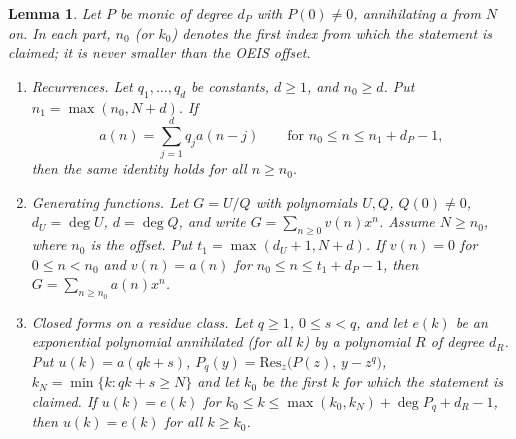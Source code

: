 \documentclass[11pt]{article}
\newtheorem{lemma}[theorem]{Lemma}
\theoremstyle{definition}
\theoremstyle{remark}
\begin{document}
\begin{lemma}\label{lem:fin}
Let $P$ be monic of degree $d_P$ with $P(0)\ne0$, annihilating $a$ from $N$ on. In each part, $n_0$ (or $k_0$) denotes the first index from which the statement is claimed; it is never smaller than the OEIS offset.
\begin{enumerate}
\item[(a)] \emph{Recurrences.} Let $q_1,\dots,q_d$ be constants, $d\ge1$, and $n_0\ge d$. Put $n_1=\max(n_0,N+d)$. If
\[ a(n)=\textstyle\sum_{j=1}^{d}q_ja(n-j)\qquad\text{for } n_0\le n\le n_1+d_P-1, \]
then the same identity holds for all $n\ge n_0$.
\item[(b)] \emph{Generating functions.} Let $G=U/Q$ with polynomials $U,Q$, $Q(0)\ne0$, $d_U=\deg U$, $d=\deg Q$, and write $G=\sum_{n\ge0}v(n)x^n$. Assume $N\ge n_0$, where $n_0$ is the offset. Put $t_1=\max(d_U+1,N+d)$. If $v(n)=0$ for $0\le n<n_0$ and $v(n)=a(n)$ for $n_0\le n\le t_1+d_P-1$, then $G=\sum_{n\ge n_0}a(n)x^n$.
\item[(c)] \emph{Closed forms on a residue class.} Let $q\ge1$, $0\le s<q$, and let $e(k)$ be an exponential polynomial annihilated (for all $k$) by a polynomial $R$ of degree $d_R$. Put $u(k)=a(qk+s)$, $P_q(y)=\mathrm{Res}_z\bigl(P(z),\,y-z^q\bigr)$, $k_N=\min\{k:qk+s\ge N\}$ and let $k_0$ be the first $k$ for which the statement is claimed. If $u(k)=e(k)$ for $k_0\le k\le \max(k_0,k_N)+\deg P_q+d_R-1$, then $u(k)=e(k)$ for all $k\ge k_0$.
\end{enumerate}
\end{lemma}
\end{document}
